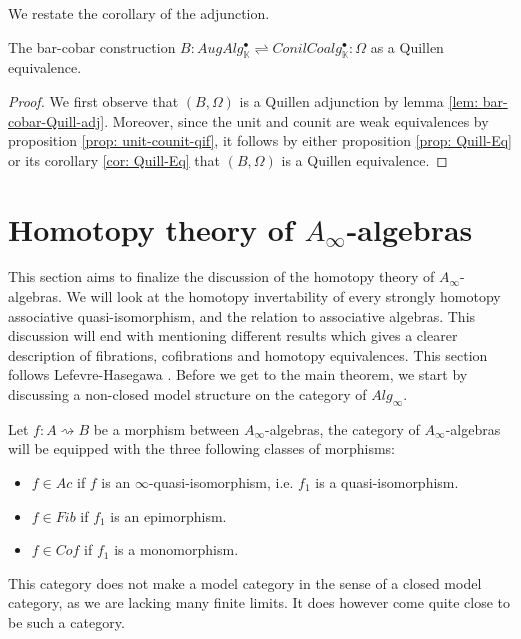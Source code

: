 \documentclass[../thesis.tex]{subfiles}
\begin{document}
        We restate the corollary of the adjunction.
        \begin{corollary}
            The bar-cobar construction $B: AugAlg^\bullet_\mathbb{K} \rightleftharpoons ConilCoalg^\bullet_\mathbb{K} : \Omega$ as a Quillen equivalence.
        \end{corollary}

        \begin{proof}
            We first observe that $(B, \Omega)$ is a Quillen adjunction by lemma \ref{lem: bar-cobar-Quill-adj}. Moreover, since the unit and counit are weak equivalences by proposition \ref{prop: unit-counit-qif}, it follows by either proposition \ref{prop: Quill-Eq} or its corollary \ref{cor: Quill-Eq} that $(B, \Omega)$ is a Quillen equivalence.
        \end{proof}

    \section{Homotopy theory of $A_{\infty}$-algebras}

        This section aims to finalize the discussion of the homotopy theory of $A_{\infty}$-algebras. We will look at the homotopy invertability of every strongly homotopy associative quasi-isomorphism, and the relation to associative algebras. This discussion will end with mentioning different results which gives a clearer description of fibrations, cofibrations and homotopy equivalences. This section follows Lefevre-Hasegawa \cite{LefevreHasegawa03}. Before we get to the main theorem, we start by discussing a non-closed model structure on the category of $Alg_\infty$.

        Let $f: A \rightsquigarrow B$ be a morphism between $A_\infty$-algebras, the category of $A_\infty$-algebras will be equipped with the three following classes of morphisms:
        \begin{itemize}
            \item $f\in Ac$ if $f$ is an $\infty$-quasi-isomorphism, i.e. $f_1$ is a quasi-isomorphism.
            \item $f\in Fib$ if $f_1$ is an epimorphism.
            \item $f\in Cof$ if $f_1$ is a monomorphism.
        \end{itemize}

        This category does not make a model category in the sense of a closed model category, as we are lacking many finite limits. It does however come quite close to be such a category.
\end{document}
